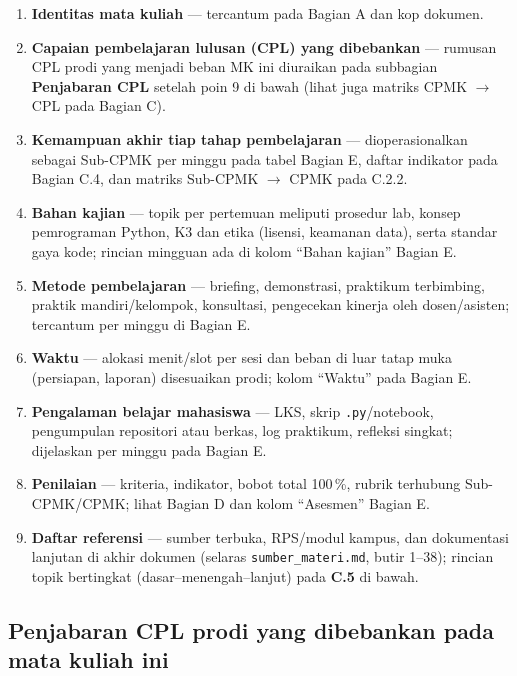 \documentclass[12pt,a4paper]{article}
\begin{document}
\begin{enumerate}[leftmargin=*,label=\textbf{\arabic*.}]
  \item \textbf{Identitas mata kuliah} --- tercantum pada Bagian A dan kop dokumen.

  \item \textbf{Capaian pembelajaran lulusan (CPL) yang dibebankan} --- rumusan CPL prodi yang menjadi beban MK ini diuraikan pada subbagian \textbf{Penjabaran CPL} setelah poin 9 di bawah (lihat juga matriks CPMK $\rightarrow$ CPL pada Bagian C).

  \item \textbf{Kemampuan akhir tiap tahap pembelajaran} --- dioperasionalkan sebagai Sub-CPMK per minggu pada tabel Bagian E, daftar indikator pada Bagian C.4, dan matriks Sub-CPMK $\rightarrow$ CPMK pada C.2.2.

  \item \textbf{Bahan kajian} --- topik per pertemuan meliputi prosedur lab, konsep pemrograman Python, K3 dan etika (lisensi, keamanan data), serta standar gaya kode; rincian mingguan ada di kolom ``Bahan kajian'' Bagian E.

  \item \textbf{Metode pembelajaran} --- briefing, demonstrasi, praktikum terbimbing, praktik mandiri/kelompok, konsultasi, pengecekan kinerja oleh dosen/asisten; tercantum per minggu di Bagian E.

  \item \textbf{Waktu} --- alokasi menit/slot per sesi dan beban di luar tatap muka (persiapan, laporan) disesuaikan prodi; kolom ``Waktu'' pada Bagian E.

  \item \textbf{Pengalaman belajar mahasiswa} --- LKS, skrip \texttt{.py}/notebook, pengumpulan repositori atau berkas, log praktikum, refleksi singkat; dijelaskan per minggu pada Bagian E.

  \item \textbf{Penilaian} --- kriteria, indikator, bobot total 100\,\%, rubrik terhubung Sub-CPMK/CPMK; lihat Bagian D dan kolom ``Asesmen'' Bagian E.

  \item \textbf{Daftar referensi} --- sumber terbuka, RPS/modul kampus, dan dokumentasi lanjutan di akhir dokumen (selaras \texttt{sumber\_materi.md}, butir 1--38); rincian topik bertingkat (dasar--menengah--lanjut) pada \textbf{C.5} di bawah.
\end{enumerate}

\subsection*{Penjabaran CPL prodi yang dibebankan pada mata kuliah ini}
\end{document}
